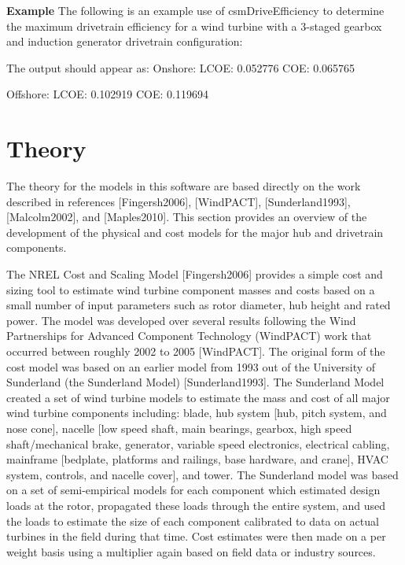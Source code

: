 \documentclass[letterpaper,10pt,openany,oneside]{sphinxmanual}
\begin{document}
\textbf{Example}
The following is an example use of csmDriveEfficiency to determine the maximum drivetrain efficiency for a wind turbine with a 3-staged gearbox and induction generator drivetrain configuration:

The output should appear as:
Onshore:
LCOE: 0.052776
COE: 0.065765

Offshore:
LCOE: 0.102919
COE: 0.119694


\chapter{Theory}
\label{theory::doc}\label{theory:theory}\label{theory:id1}
The theory for the models in this software are based directly on the work described in references {[}Fingersh2006{]}, {[}WindPACT{]}, {[}Sunderland1993{]}, {[}Malcolm2002{]}, and {[}Maples2010{]}.  This section provides an overview of the development of the physical and cost models for the major hub and drivetrain components.

The NREL Cost and Scaling Model {[}Fingersh2006{]} provides a simple cost and sizing tool to estimate wind turbine component masses and costs based on a small number of input parameters such as rotor diameter, hub height and rated power.  The model was developed over several results following the Wind Partnerships for Advanced Component Technology (WindPACT) work that occurred between roughly 2002 to 2005 {[}WindPACT{]}.  The original form of the cost model was based on an earlier model from 1993 out of the University of Sunderland (the Sunderland Model) {[}Sunderland1993{]}.  The Sunderland Model created a set of wind turbine models to estimate the mass and cost of all major wind turbine components including: blade, hub system {[}hub, pitch system, and nose cone{]}, nacelle {[}low speed shaft, main bearings, gearbox, high speed shaft/mechanical brake, generator, variable speed electronics, electrical cabling, mainframe {[}bedplate, platforms and railings, base hardware, and crane{]}, HVAC system, controls, and nacelle cover{]}, and tower.  The Sunderland model was based on a set of semi-empirical models for each component which estimated design loads at the rotor, propagated these loads through the entire system, and used the loads to estimate the size of each component calibrated to data on actual turbines in the field during that time.  Cost estimates were then made on a per weight basis using a multiplier again based on field data or industry sources.
\end{document}
